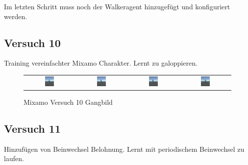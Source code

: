 Im letzten Schritt muss noch der Walkeragent hinzugefügt und konfiguriert werden.

\subsection{Versuch 10}
Training vereinfachter Mixamo Charakter. Lernt zu galoppieren.

\begin{figure}[H]
  \centering
  \begin{tabular}{cccc}
    \includegraphics[width=0.2\textwidth]{img/mixamo_galoppieren1.png} & \includegraphics[width=0.2\textwidth]{img/mixamo_galoppieren2.png} & \includegraphics[width=0.2\textwidth]{img/mixamo_galoppieren3.png} & \includegraphics[width=0.2\textwidth]{img/mixamo_galoppieren4.png} \\
  \end{tabular}
  \caption{Mixamo Versuch 10 Gangbild}
  \label{fig:mixamo_versuch10_gangbild}
\end{figure}

\subsection{Versuch 11}
Hinzufügen von Beinwechsel Belohnung. Lernt mit periodischem Beinwechsel zu laufen.

